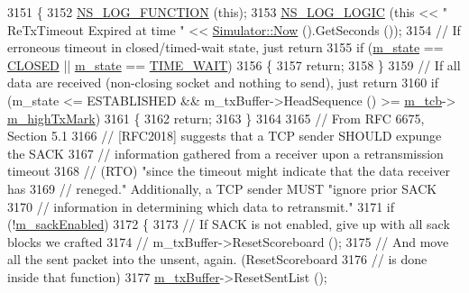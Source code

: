 \begin{DoxyCode}
3151 \{
3152   \hyperlink{log-macros-disabled_8h_a90b90d5bad1f39cb1b64923ea94c0761}{NS\_LOG\_FUNCTION} (\textcolor{keyword}{this});
3153   \hyperlink{group__logging_ga88acd260151caf2db9c0fc84997f45ce}{NS\_LOG\_LOGIC} (\textcolor{keyword}{this} << \textcolor{stringliteral}{" ReTxTimeout Expired at time "} << 
      \hyperlink{classns3_1_1Simulator_ac3178fa975b419f7875e7105be122800}{Simulator::Now} ().GetSeconds ());
3154   \textcolor{comment}{// If erroneous timeout in closed/timed-wait state, just return}
3155   \textcolor{keywordflow}{if} (\hyperlink{classns3_1_1TcpSocketBase_a5db6f29272f23546e23320c06a681f3e}{m\_state} == \hyperlink{group__tcp_gga3929cdb47bdf159657fa24054aa5ca03a9ce7d71243551037394c5e691627e66f}{CLOSED} || \hyperlink{classns3_1_1TcpSocketBase_a5db6f29272f23546e23320c06a681f3e}{m\_state} == \hyperlink{group__tcp_gga3929cdb47bdf159657fa24054aa5ca03aabab2f97744253d961a122fa320db73b}{TIME\_WAIT})
3156     \{
3157       \textcolor{keywordflow}{return};
3158     \}
3159   \textcolor{comment}{// If all data are received (non-closing socket and nothing to send), just return}
3160   \textcolor{keywordflow}{if} (m\_state <= ESTABLISHED && m\_txBuffer->HeadSequence () >= \hyperlink{classns3_1_1TcpSocketBase_a26bbaf59001308dc43fb630d76f2e38b}{m\_tcb}->
      \hyperlink{classns3_1_1TcpSocketState_a2c46f51fd8e2bf43b564ea838b43b8bb}{m\_highTxMark})
3161     \{
3162       \textcolor{keywordflow}{return};
3163     \}
3164 
3165   \textcolor{comment}{// From RFC 6675, Section 5.1}
3166   \textcolor{comment}{// [RFC2018] suggests that a TCP sender SHOULD expunge the SACK}
3167   \textcolor{comment}{// information gathered from a receiver upon a retransmission timeout}
3168   \textcolor{comment}{// (RTO) "since the timeout might indicate that the data receiver has}
3169   \textcolor{comment}{// reneged."  Additionally, a TCP sender MUST "ignore prior SACK}
3170   \textcolor{comment}{// information in determining which data to retransmit."}
3171   \textcolor{keywordflow}{if} (!\hyperlink{classns3_1_1TcpSocketBase_af79c709855a362f331251ef73167209a}{m\_sackEnabled})
3172     \{
3173       \textcolor{comment}{// If SACK is not enabled, give up with all sack blocks we crafted}
3174       \textcolor{comment}{// m\_txBuffer->ResetScoreboard ();}
3175       \textcolor{comment}{// And move all the sent packet into the unsent, again. (ResetScoreboard}
3176       \textcolor{comment}{// is done inside that function)}
3177       \hyperlink{classns3_1_1TcpSocketBase_a4a1b53982ffd851bd07ab8d5005c130e}{m\_txBuffer}->ResetSentList ();

\end{DoxyCode}
